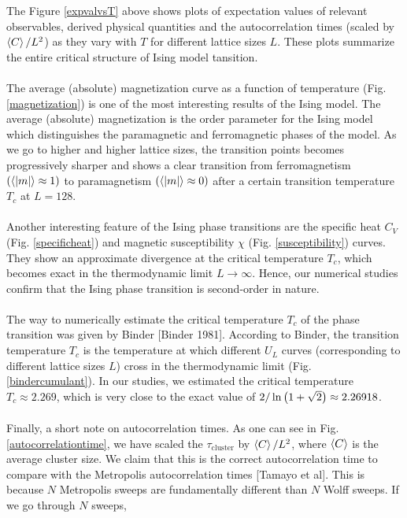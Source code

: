 \documentclass[../thesis_main.tex]{subfiles}
\begin{document}
\FloatBarrier \!\!\!\!\!\!\!\!\!\!\!\!
The Figure \ref{expvalvsT} above shows plots of expectation values of relevant observables, derived physical quantities and the autocorrelation times (scaled by $\expval{C}/L^2$) as they vary with $T$ for different lattice sizes $L$. These plots summarize the entire critical structure of Ising model tansition.~\\~\\
The average (absolute) magnetization curve as a function of temperature (Fig. \ref{magnetization}) is one of the most interesting results of the Ising model. The average (absolute) magnetization is the order parameter for the Ising model which distinguishes the paramagnetic and ferromagnetic phases of the model. As we go to higher and higher lattice sizes, the transition points becomes progressively sharper and shows a clear transition from ferromagnetism $(\expval{|m|} \approx 1)$ to paramagnetism $(\expval{|m|} \approx 0)$ after a certain transition temperature $T_c$ at $L = 128$.~\\~\\
Another interesting feature of the Ising phase transitions are the specific heat $C_V$ (Fig. \ref{specificheat}) and magnetic susceptibility $\chi$ (Fig. \ref{susceptibility}) curves. They show an approximate divergence at the critical temperature $T_c$, which becomes exact in the thermodynamic limit $L \to \infty$. Hence, our numerical studies confirm that the Ising phase transition is second-order in nature.~\\~\\
The way to numerically estimate the critical temperature $T_c$ of the phase transition was given by Binder [Binder 1981]. According to Binder, the transition temperature $T_c$ is the temperature at which different $U_L$ curves (corresponding to different lattice sizes $L$) cross in the thermodynamic limit (Fig. \ref{bindercumulant}). In our studies, we estimated the critical temperature $T_c \approx 2.269$, which is very close to the exact value of $2/\ln\qty(1+\sqrt{2}) \approx 2.26918$.~\\~\\
Finally, a short note on autocorrelation times. As one can see in Fig. \ref{autocorrelationtime}, we have scaled the $\tau_\text{cluster}$ by $\expval{C}/L^2$, where $\expval{C}$ is the average cluster size. We claim that this is the correct autocorrelation time to compare with the Metropolis autocorrelation times [Tamayo et al]. This is because $N$ Metropolis sweeps are fundamentally different than $N$ Wolff sweeps. If we go through $N$ sweeps, 
\end{document}
